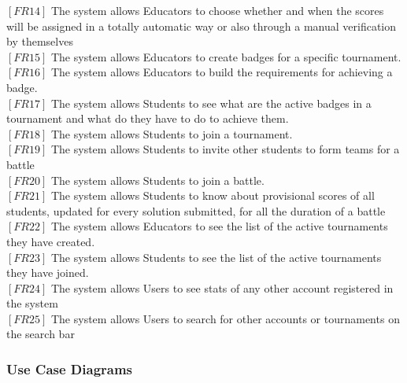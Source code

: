 \documentclass{article}
\begin{document}
$[FR14]$ The system allows Educators to choose whether and when the scores will be assigned in a totally automatic way or also through a manual verification by themselves\\
$[FR15]$ The system allows Educators to create badges for a specific tournament.\\
$[FR16]$ The system allows Educators to build the requirements for achieving a badge.\\
$[FR17]$ The system allows Students to see what are the active badges in a tournament and what do they have to do to achieve them.\\
$[FR18]$ The system allows Students to join a tournament.\\
$[FR19]$ The system allows Students to invite other students to form teams for a battle\\
$[FR20]$ The system allows Students to join a battle. \\
$[FR21]$ The system allows Students to know about provisional scores of all students, updated for every solution submitted, for all the duration of a battle\\
$[FR22]$ The system allows Educators to see the list of the active tournaments they have created.\\
$[FR23]$ The system allows Students to see the list of the active tournaments they have joined.\\
$[FR24]$ The system allows Users to see stats of any other account registered in the system\\
$[FR25]$ The system allows Users to search for other accounts or tournaments on the search bar\\


\subsubsection{Use Case Diagrams}
\newpage
\end{document}
